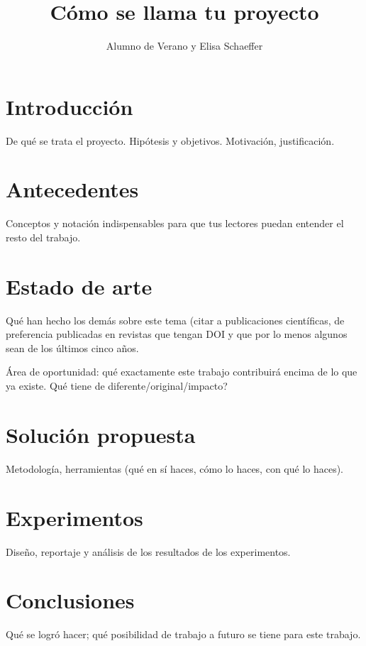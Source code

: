 \documentclass{sciposter}
\title{Cómo se llama tu proyecto}
\author{Alumno de Verano y Elisa Schaeffer}
\institute {Posgrado en Ingeniería de Sistemas}
\begin{document}

\maketitle

\section{Introducción}

De qué se trata el proyecto. Hipótesis y objetivos. Motivación, justificación.

\section{Antecedentes}

Conceptos y notación indispensables para que tus lectores puedan entender el resto del trabajo.

\section{Estado de arte}

Qué han hecho los demás sobre este tema (citar a publicaciones científicas, de preferencia publicadas en revistas que tengan DOI y que por lo menos algunos sean de los últimos cinco años.

Área de oportunidad: qué exactamente este trabajo contribuirá encima de lo que ya existe.  {\textquestiondown}Qué tiene de diferente/original/impacto?

\section{Solución propuesta}

Metodología, herramientas (qué en sí haces, cómo lo haces, con qué lo haces).

\section{Experimentos}

Diseño, reportaje y análisis de los resultados de los experimentos.

\section{Conclusiones}

Qué se logró hacer; qué posibilidad de trabajo a futuro se tiene para este trabajo.
\end{document}
